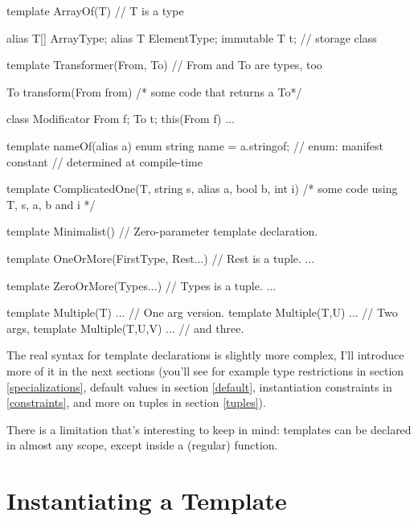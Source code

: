 \begin{ndcode}
template ArrayOf(T) // T is a type
{
    alias T[] ArrayType;
    alias T ElementType;
    immutable T t; // storage class

}

template Transformer(From, To) // From and To are types, too
{
    To transform(From from) { /* some code that returns a To*/}

    class Modificator
    {
        From f;
        To t;
        this(From f) { ... }
    }
}

template nameOf(alias a)
{
    enum string name = a.stringof; // enum: manifest constant
                                   // determined at compile-time
}

template ComplicatedOne(T, string s, alias a, bool b, int i)
{ /* some code using T, s, a, b and i */ }

template Minimalist() {} // Zero-parameter template declaration.

template OneOrMore(FirstType, Rest...) // Rest is a tuple.
{ ... }

template ZeroOrMore(Types...) // Types is a tuple.
{ ... }

template Multiple(T)     { ... } // One arg version.
template Multiple(T,U)   { ... } // Two args,
template Multiple(T,U,V) { ... } // and three.
\end{ndcode}

The real syntax for template declarations is slightly more complex, I'll introduce more of it in the next sections (you'll see for example type restrictions in section \ref{specializations}, default values in section \ref{default}, instantiation constraints in \ref{constraints}, and more on tuples in section \ref{tuples}).

There is a limitation that's interesting to keep in mind: templates can be declared in almost any scope, except inside a (regular) function.


\section{Instantiating a Template}\label{instantiating}


